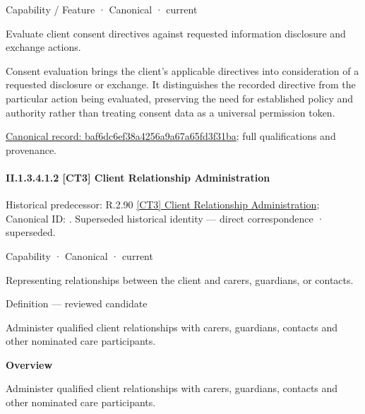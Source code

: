 \label{element:baf6dc6ef38a4256a9a67a65fd3f31ba}
{\small Capability / Feature · Canonical · current}\par

Evaluate client consent directives against requested information disclosure and exchange actions.



Consent evaluation brings the client's applicable directives into consideration of a requested disclosure or exchange. It distinguishes the recorded directive from the particular action being evaluated, preserving the need for established policy and authority rather than treating consent data as a universal permission token.


{\footnotesize \href{../../../../continuum/strategy/capability/feature/baf6dc6ef38a4256a9a67a65fd3f31ba.md}{Canonical record: baf6dc6ef38a4256a9a67a65fd3f31ba}; full qualifications and provenance.}\par
\paragraph*{II.1.3.4.1.2 [CT3] Client Relationship Administration}
\label{navigation:II.1.3.4.1.2}

{\small Historical predecessor: R.2.90 \hyperref[element:2c799ec0c4c74c97a75c12e949887b95]{[CT3] Client Relationship Administration}; Canonical ID: \texttt{}. Superseded historical identity — direct correspondence · superseded.}\par
\label{element:d682c11d3eb04770b1f20be478fd475e}
{\small Capability · Canonical · current}\par

Representing relationships between the client and carers, guardians, or contacts.



Definition — reviewed candidate



Administer qualified client relationships with carers, guardians, contacts and other nominated care participants.



\textbf{Overview}



Administer qualified client relationships with carers, guardians, contacts and other nominated care participants.



